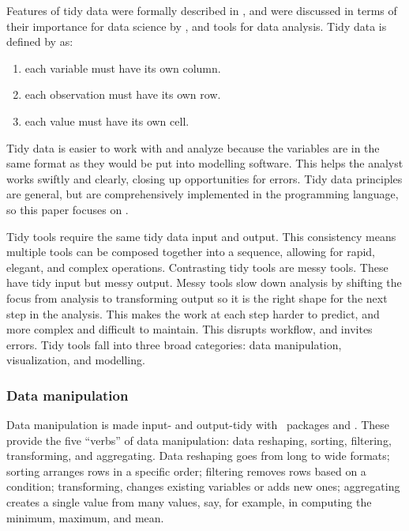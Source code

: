 \documentclass[article]{jss}
\providecommand{\tightlist}{%
  \setlength{\itemsep}{0pt}\setlength{\parskip}{0pt}}
\begin{document}
Features of tidy data were formally described in \citet{Wickham2014}, and
were discussed in terms of their importance for data science by
\citet{Donoho2017}, and tools for data analysis.  Tidy data is defined by
\citet{r4ds} as:
%
\begin{enumerate}
\item
  each variable must have its own column.
\item
  each observation must have its own row.
\item
  each value must have its own cell.
\end{enumerate}
%
Tidy data is easier to work with and analyze because the variables are in
the same format as they would be put into modelling software.  This helps
the analyst works swiftly and clearly, closing up opportunities for errors.
Tidy data principles are general, but are comprehensively implemented in the
 programming language, so this paper focuses on 
\citep{rcore}.

Tidy tools require the same tidy data input and output.  This consistency
means multiple tools can be composed together into a sequence, allowing for
rapid, elegant, and complex operations.  Contrasting tidy tools are messy
tools.  These have tidy input but messy output.  Messy tools slow down
analysis by shifting the focus from analysis to transforming output so it is
the right shape for the next step in the analysis.  This makes the work at
each step harder to predict, and more complex and difficult to maintain.
This disrupts workflow, and invites errors.  Tidy tools fall into three
broad categories: data manipulation, visualization, and modelling.

\hypertarget{tidy-data-manip}{%
\subsubsection{Data manipulation}\label{tidy-data-manip}}

Data manipulation is made input- and output-tidy with ~packages
 and  \citep{dplyr, tidyr}.  These provide the five
``verbs'' of data manipulation: data reshaping, sorting, filtering,
transforming, and aggregating.  Data reshaping goes from long to wide
formats; sorting arranges rows in a specific order; filtering removes rows
based on a condition; transforming, changes existing variables or adds new
ones; aggregating creates a single value from many values, say, for example,
in computing the minimum, maximum, and mean.
\end{document}
